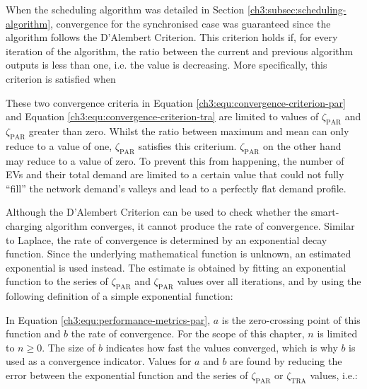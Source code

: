 When the scheduling algorithm was detailed in Section \ref{ch3:subsec:scheduling-algorithm}, convergence for the synchronised case was guaranteed since the algorithm follows the D'Alembert Criterion.
This criterion holds if, for every iteration of the algorithm, the ratio between the current and previous algorithm outputs is less than one, i.e. the value is decreasing.
More specifically, this criterion is satisfied when



These two convergence criteria in Equation \ref{ch3:equ:convergence-criterion-par} and Equation \ref{ch3:equ:convergence-criterion-tra} are limited to values of $\zeta_\text{PAR}$ and $\zeta_\text{PAR}$ greater than zero.
Whilst the ratio between maximum and mean can only reduce to a value of one, $\zeta_\text{PAR}$ satisfies this criterium.
$\zeta_\text{PAR}$ on the other hand may reduce to a value of zero.
To prevent this from happening, the number of EVs and their total demand are limited to a certain value that could not fully ``fill'' the network demand's valleys and lead to a perfectly flat demand profile.

Although the D'Alembert Criterion can be used to check whether the smart-charging algorithm converges, it cannot produce the rate of convergence.
Similar to Laplace, the rate of convergence is determined by an exponential decay function.
Since the underlying mathematical function is unknown, an estimated exponential is used instead.
The estimate is obtained by fitting an exponential function to the series of $\zeta_\text{PAR}$ and $\zeta_\text{PAR}$ values over all iterations, and by using the following definition of a simple exponential function:



In Equation \ref{ch3:equ:performance-metrics-par}, $a$ is the zero-crossing point of this function and $b$ the rate of convergence.
For the scope of this chapter, $n$ is limited to $n \geq 0$.
The size of $b$ indicates how fast the values converged, which is why $b$ is used as a convergence indicator.
Values for $a$ and $b$ are found by reducing the error between the exponential function and the series of $\zeta_\text{PAR}$ or $\zeta_\text{TRA}$ values, i.e.:



